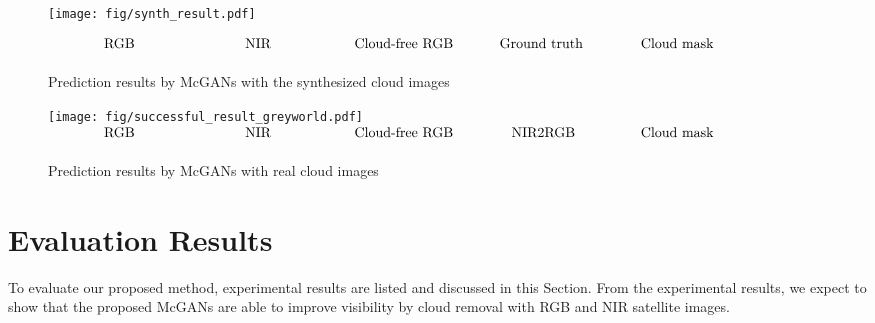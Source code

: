 \documentclass[10pt,twocolumn,letterpaper]{article}
\begin{document}
\begin{figure*}[!t]
\begin{center}
\hspace*{0mm}\texttt{[image: fig/synth\_result.pdf]}

$\begin{array}{p{32mm}p{32mm}p{32mm}p{32mm}p{32mm}}
 \hspace*{12mm}\raisebox{1mm}{RGB}
&\hspace*{12mm}\raisebox{1mm}{NIR}
&\hspace*{4mm}\raisebox{1mm}{Cloud-free RGB}
&\hspace*{5mm}\raisebox{1mm}{Ground truth}
&\hspace*{5mm}\raisebox{1mm}{Cloud mask}
\end{array}$
\caption{Prediction results by McGANs with the synthesized cloud images}
\label{fig:result02}
\end{center}
\end{figure*}

\begin{figure*}[htb]
\begin{center}
\vspace{-5mm}
\hspace*{0mm}\texttt{[image: fig/successful\_result\_greyworld.pdf]}
\vspace{-2mm}
$\begin{array}{p{32mm}p{32mm}p{32mm}p{32mm}p{32mm}}
 \hspace*{12mm}\raisebox{1mm}{RGB}
&\hspace*{12mm}\raisebox{1mm}{NIR}
&\hspace*{4mm}\raisebox{1mm}{Cloud-free RGB}
&\hspace*{8mm}\raisebox{1mm}{NIR2RGB}
&\hspace*{5mm}\raisebox{1mm}{Cloud mask}
\end{array}$
\caption{Prediction results by McGANs with real cloud images}
\label{fig:result01}
\end{center}
\end{figure*}

\section{Evaluation Results}
To evaluate our proposed method, experimental results are listed and discussed in this Section. From the experimental results, we expect to show that the proposed McGANs are able to improve visibility by cloud removal with RGB and NIR satellite images.
\end{document}
